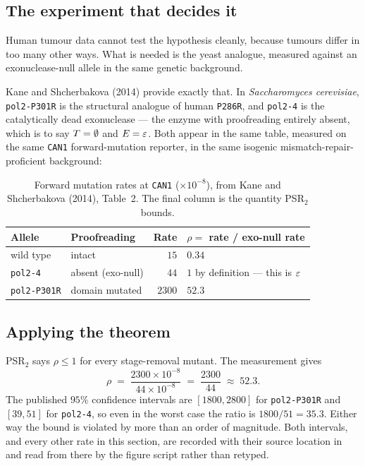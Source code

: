 \subsection{The experiment that decides it}

Human tumour data cannot test the hypothesis cleanly, because tumours differ in
too many other ways. What is needed is the yeast analogue, measured against an
exonuclease-null allele in the same genetic background.

Kane and Shcherbakova (2014) provide exactly that. In \emph{Saccharomyces
cerevisiae}, \texttt{pol2-P301R} is the structural analogue of human
\texttt{P286R}, and \texttt{pol2-4} is the catalytically dead exonuclease --- the
enzyme with proofreading entirely absent, which is to say $T = \emptyset$ and
$E = \varepsilon$. Both appear in the same table, measured on the same
\texttt{CAN1} forward-mutation reporter, in the same isogenic
mismatch-repair-proficient background:

\begin{table}[htbp]
\centering
\caption{Forward mutation rates at \texttt{CAN1} ($\times10^{-8}$), from Kane and
Shcherbakova (2014), Table~2. The final column is the quantity PSR$_2$ bounds.}
\label{tab:kane}
\begin{tabularx}{0.92\textwidth}{@{}l l r X@{}}
\toprule
\textbf{Allele} & \textbf{Proofreading} & \textbf{Rate} & \textbf{$\rho = $ rate / exo-null rate} \\
\midrule
wild type & intact & $15$ & $0.34$ \\
\texttt{pol2-4} & absent (exo-null) & $44$ & $1$ by definition --- this is $\varepsilon$ \\
\texttt{pol2-P301R} & domain mutated & $2300$ & $\mathbf{52.3}$ \\
\bottomrule
\end{tabularx}
\end{table}

\subsection{Applying the theorem}

PSR$_2$ says $\rho \le 1$ for every stage-removal mutant. The measurement gives
\begin{equation}\label{eq:rho}
  \rho \;=\; \frac{2300 \times 10^{-8}}{44 \times 10^{-8}} \;=\; \frac{2300}{44} \;\approx\; 52.3 .
\end{equation}
The published $95\%$ confidence intervals are $[1800, 2800]$ for
\texttt{pol2-P301R} and $[39, 51]$ for \texttt{pol2-4}, so even in the worst case
the ratio is $1800/51 = 35.3$. Either way the bound is violated by more than an
order of magnitude. Both intervals, and every other rate in this section, are
recorded with their source location in
 and read from there by the figure
script rather than retyped.

